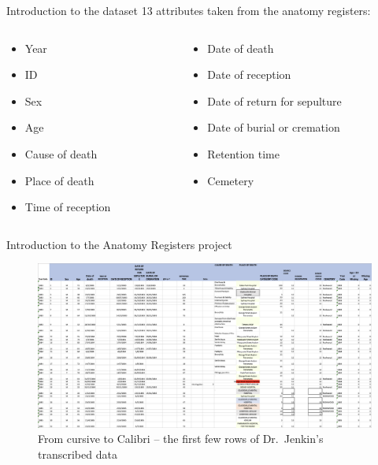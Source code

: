 \documentclass[]{beamer}
\begin{document}
\begin{frame}[fragile]{Introduction to the dataset}
	13 attributes taken from the anatomy registers:

	\begin{columns}[T]
		\begin{column}{0.5\textwidth}
			\begin{itemize}
				\item Year
				\item ID
				\item Sex
				\item Age
				\item Cause of death
				\item Place of death
				\item Time of reception
			\end{itemize}
		\end{column}
		\begin{column}{0.5\textwidth}
			\begin{itemize}
				\item Date of death
				\item Date of reception
				\item Date of return for sepulture
				\item Date of burial or cremation
				\item Retention time
				\item Cemetery
			\end{itemize}	
		\end{column}
	\end{columns}
\end{frame}

\begin{frame}[fragile]{Introduction to the Anatomy Registers project}
	\begin{figure}
		\includegraphics[width=\textwidth]{img/excel_dataset.png}
		\caption{From cursive to Calibri -- the first few rows of Dr.~Jenkin's transcribed data}
	\end{figure}
\end{frame}
\end{document}
